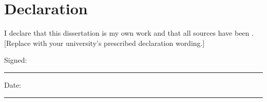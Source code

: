 \chapter*{Declaration}

I declare that this dissertation is my own work and that all sources
have been . [Replace with your university's prescribed
declaration wording.]

\vspace{2cm}
\noindent Signed: \rule{5cm}{0.4pt} \hfill Date: \rule{3cm}{0.4pt}
